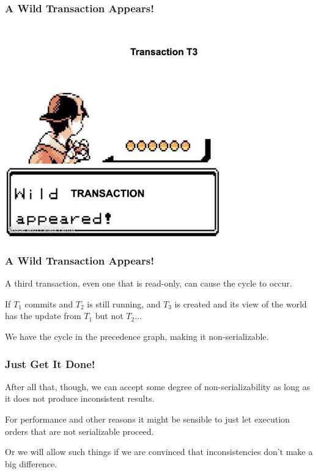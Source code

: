 \begin{frame}
\frametitle{A Wild Transaction Appears!}

\begin{center}
	\includegraphics[width=0.7\textwidth]{images/t3.png}
\end{center}

\end{frame}

\begin{frame}
\frametitle{A Wild Transaction Appears!}

A third transaction, even one that is read-only, can cause the cycle to occur. 

If $T_{1}$ commits and $T_{2}$ is still running, and $T_{3}$ is created and its view of the world has the update from $T_{1}$ but not $T_{2}$...

We have the cycle in the precedence graph, making it non-serializable.


\end{frame}

\begin{frame}
\frametitle{Just Get It Done!}

After all that, though, we can accept some degree of non-serializability as long as it does not produce inconsistent results. 

For performance and other reasons it might be sensible to just let execution orders that are not serializable proceed.  

Or we will allow such things if we are convinced that inconsistencies don't make a big difference. 


\end{frame}

